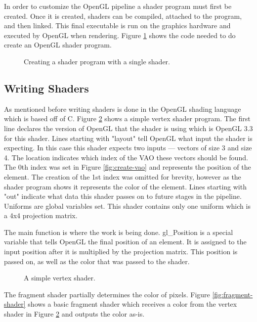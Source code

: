 \documentclass{article}
\begin{document}
In order to customize the OpenGL pipeline a shader program must first be created. Once it is created, shaders can be compiled, attached to the program, and then linked. This final executable is run on the graphics hardware and executed by OpenGL when rendering. Figure \ref{fig:shader-program} shows the code needed to do create an OpenGL shader program.

\begin{figure}[b]
	
	\caption{Creating a shader program with a single shader.}
	\label{fig:shader-program}
\end{figure}

\subsection{Writing Shaders}

As mentioned before writing shaders is done in the OpenGL shading language which is based off of C. Figure \ref{fig:vertex-shader} shows a simple vertex shader program. The first line declares the version of OpenGL that the shader is using which is OpenGL 3.3 for this shader. Lines starting with "layout" tell OpenGL what input the shader is expecting. In this case this shader expects two inputs --- vectors of size 3 and size 4. The location indicates which index of the VAO these vectors should be found. The 0th index was set in Figure \ref{fig:create-vao} and represents the position of the element. The creation of the 1st index was omitted for brevity, however as the shader program shows it represents the color of the element. Lines starting with "out" indicate what data this shader passes on to future stages in the pipeline. Uniforms are global variables set. This shader contains only one uniform which is a 4x4 projection matrix.

The main function is where the work is being done. gl\_Position is a special variable that tells OpenGL the final position of an element. It is assigned to the input position after it is multiplied by the projection matrix. This position is passed on, as well as the color that was passed to the shader.

\begin{figure}[h]
	
	\caption{A simple vertex shader.}
	\label{fig:vertex-shader}
\end{figure}

The fragment shader partially determines the color of pixels. Figure \ref{fig:fragment-shader} shows a basic fragment shader which receives a color from the vertex shader in Figure \ref{fig:vertex-shader} and outputs the color as-is.
\end{document}

